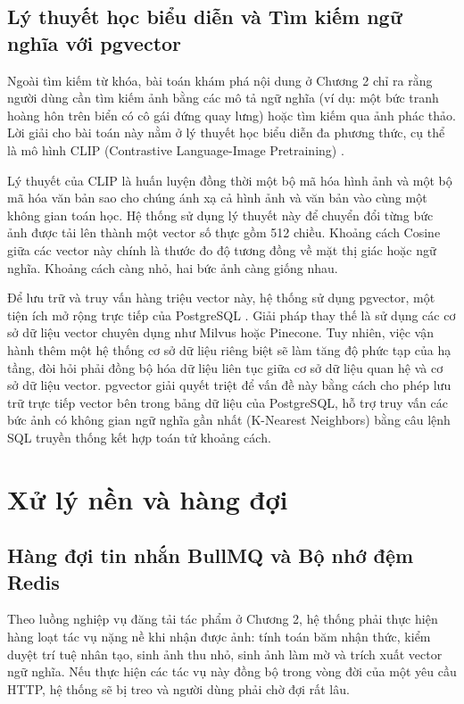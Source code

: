 \subsection{Lý thuyết học biểu diễn và Tìm kiếm ngữ nghĩa với pgvector}

Ngoài tìm kiếm từ khóa, bài toán khám phá nội dung ở Chương 2 chỉ ra rằng người dùng cần tìm kiếm ảnh bằng các mô tả ngữ nghĩa (ví dụ: một bức tranh hoàng hôn trên biển có cô gái đứng quay lưng) hoặc tìm kiếm qua ảnh phác thảo. Lời giải cho bài toán này nằm ở lý thuyết học biểu diễn đa phương thức, cụ thể là mô hình CLIP (Contrastive Language-Image Pretraining) \cite{clip}.

Lý thuyết của CLIP là huấn luyện đồng thời một bộ mã hóa hình ảnh và một bộ mã hóa văn bản sao cho chúng ánh xạ cả hình ảnh và văn bản vào cùng một không gian toán học. Hệ thống sử dụng lý thuyết này để chuyển đổi từng bức ảnh được tải lên thành một vector số thực gồm 512 chiều. Khoảng cách Cosine giữa các vector này chính là thước đo độ tương đồng về mặt thị giác hoặc ngữ nghĩa. Khoảng cách càng nhỏ, hai bức ảnh càng giống nhau.

Để lưu trữ và truy vấn hàng triệu vector này, hệ thống sử dụng pgvector, một tiện ích mở rộng trực tiếp của PostgreSQL \cite{pgvector}. Giải pháp thay thế là sử dụng các cơ sở dữ liệu vector chuyên dụng như Milvus hoặc Pinecone. Tuy nhiên, việc vận hành thêm một hệ thống cơ sở dữ liệu riêng biệt sẽ làm tăng độ phức tạp của hạ tầng, đòi hỏi phải đồng bộ hóa dữ liệu liên tục giữa cơ sở dữ liệu quan hệ và cơ sở dữ liệu vector. pgvector giải quyết triệt để vấn đề này bằng cách cho phép lưu trữ trực tiếp vector bên trong bảng dữ liệu của PostgreSQL, hỗ trợ truy vấn các bức ảnh có không gian ngữ nghĩa gần nhất (K-Nearest Neighbors) bằng câu lệnh SQL truyền thống kết hợp toán tử khoảng cách.

\section{Xử lý nền và hàng đợi}

\subsection{Hàng đợi tin nhắn BullMQ và Bộ nhớ đệm Redis}

Theo luồng nghiệp vụ đăng tải tác phẩm ở Chương 2, hệ thống phải thực hiện hàng loạt tác vụ nặng nề khi nhận được ảnh: tính toán băm nhận thức, kiểm duyệt trí tuệ nhân tạo, sinh ảnh thu nhỏ, sinh ảnh làm mờ và trích xuất vector ngữ nghĩa. Nếu thực hiện các tác vụ này đồng bộ trong vòng đời của một yêu cầu HTTP, hệ thống sẽ bị treo và người dùng phải chờ đợi rất lâu.

